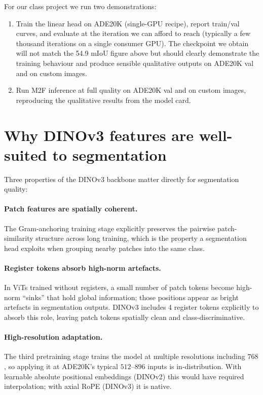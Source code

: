 \documentclass[11pt,a4paper]{article}
\begin{document}
For our class project we run two demonstrations:
\begin{enumerate}[leftmargin=1.6em,itemsep=0pt]
  \item Train the linear head on ADE20K (single-GPU recipe), report
        train/val curves, and evaluate at the iteration we can afford to
        reach (typically a few thousand iterations on a single consumer
        GPU). The checkpoint we obtain will not match the 54.9 mIoU figure
        above but should clearly demonstrate the training behaviour and
        produce sensible qualitative outputs on ADE20K val and on
        custom images.
  \item Run M2F inference at full quality on ADE20K val and on custom
        images, reproducing the qualitative results from the model card.
\end{enumerate}

\section{Why DINOv3 features are well-suited to segmentation}

Three properties of the DINOv3 backbone matter directly for segmentation
quality:

\paragraph{Patch features are spatially coherent.} The Gram-anchoring
training stage explicitly preserves the pairwise patch-similarity
structure across long training, which is the property a segmentation head
exploits when grouping nearby patches into the same class.

\paragraph{Register tokens absorb high-norm artefacts.} In ViTs trained
without registers, a small number of patch tokens become high-norm
``sinks'' that hold global information; those positions appear as bright
artefacts in segmentation outputs. DINOv3 includes 4 register tokens
explicitly to absorb this role, leaving patch tokens spatially clean and
class-discriminative.

\paragraph{High-resolution adaptation.} The third pretraining stage trains
the model at multiple resolutions including $768$, so applying it at
ADE20K's typical $512$--$896$ inputs is in-distribution. With learnable
absolute positional embeddings (DINOv2) this would have required
interpolation; with axial RoPE (DINOv3) it is native.
\end{document}
